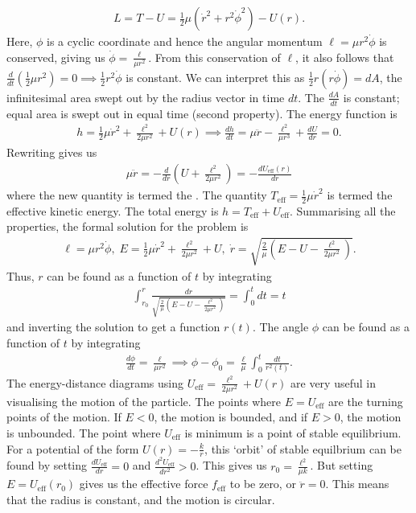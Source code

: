 \begin{align}
    L = T-U = \frac{1}{2}\mu(\dot{r}^{2} + r^{2}\dot{\phi}^{2}) - U(r).
\end{align}
Here, $\phi$ is a cyclic coordinate and hence the angular momentum $\ell = \mu r^{2}\dot{\phi}$ is conserved, giving us $\dot{\phi} = \frac{\ell}{\mu r^{2}}$. From this conservation of $\ell$, it also follows that $\frac{d}{dt}(\frac{1}{2}\mu r^{2}) = 0 \implies \frac{1}{2}r^{2}\dot{\phi}$ is constant. We can interpret this as $\frac{1}{2}r(r\dot{\phi}) = dA$, the infinitesimal area swept out by the radius vector in time $dt$. The  $\frac{dA}{dt}$ is constant; equal area is swept out in equal time (second property). The energy function is
\begin{align}
    h = \frac{1}{2}\mu\dot{r}^{2} + \frac{\ell^{2}}{2\mu r^{2}} + U(r) \implies \frac{dh}{dt} = \mu\ddot{r} - \frac{\ell^{2}}{\mu r^{3}} + \frac{dU}{dr} = 0.
\end{align}
Rewriting gives us
\begin{align}
    \mu\ddot{r} = -\frac{d}{dr}\left( U + \frac{\ell^{2}}{2\mu r^{2}} \right) = -\frac{dU_{\text{eff}}(r)}{dr}
\end{align}
where the new quantity is termed the . The quantity $T_{\text{eff}} = \frac{1}{2}\mu\dot{r}^{2}$ is termed the effective kinetic energy. The total energy is $h = T_{\text{eff}} + U_{\text{eff}}$. Summarising all the properties, the formal solution for the problem is
\begin{align}
    \ell = \mu r^{2}\dot{\phi},\; E=\frac{1}{2}\mu \dot{r}^{2} + \frac{\ell^{2}}{2\mu r^{2}} + U,\; \dot{r} = \sqrt{\frac{2}{\mu}\left( E-U-\frac{\ell^{2}}{2 \mu r^{2}} \right)}.
\end{align}
Thus, $r$ can be found as a function of $t$ by integrating
\begin{align}
    \int_{r_{0}}^{r} \frac{dr}{\sqrt{\frac{2}{\mu}\left( E-U-\frac{\ell^{2}}{2 \mu r^{2}} \right)}} = \int_{0}^{t} dt = t
\end{align}
and inverting the solution to get a function $r(t)$. The angle $\phi$ can be found as a function of $t$ by integrating
\begin{align}
    \frac{d\phi}{dt} = \frac{\ell}{\mu r^{2}} \implies \phi - \phi_{0} = \frac{\ell}{\mu}\int_{0}^{t} \frac{dt}{r^{2}(t)}.
\end{align}
The energy-distance diagrams using $U_{\text{eff}} = \frac{\ell^{2}}{2\mu r^{2}} + U(r)$ are very useful in visualising the motion of the particle. The points where $E = U_{\text{eff}}$ are the turning points of the motion. If $E < 0$, the motion is bounded, and if $E > 0$, the motion is unbounded. The point where $U_{\text{eff}}$ is minimum is a point of stable equilibrium. For a potential of the form $U(r) = -\frac{k}{r}$, this `orbit' of stable equilbrium can be found by setting $\frac{dU_{\text{eff}}}{dr} = 0$ and $\frac{d^{2}U_{\text{eff}}}{dr^{2}} > 0$. This gives us $r_{0} = \frac{\ell^{2}}{\mu k}$. But setting $E = U_{\text{eff}}(r_{0})$ gives us the effective force $f_{\text{eff}}$ to be zero, or $\ddot{r} = 0$. This means that the radius is constant, and the motion is circular.\\

